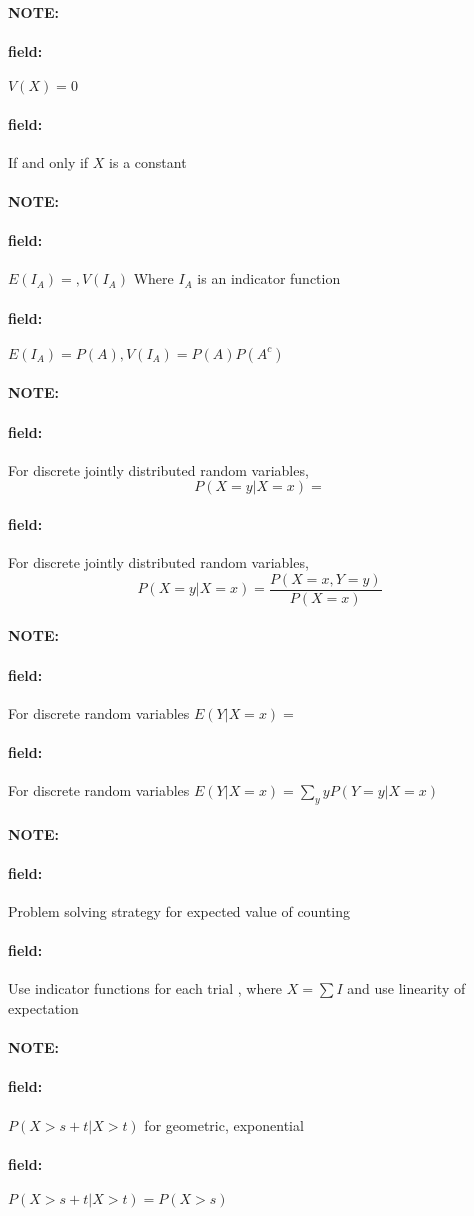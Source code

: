 \documentclass[12pt]{article}
\newenvironment{note}{\paragraph{NOTE:}}{}
\newenvironment{field}{\paragraph{field:}}{}
\begin{document}
\begin{note}
  \begin{field}
    $V(X) = 0$
  \end{field}
  \begin{field}
    If and only if $X $ is a constant
  \end{field}
\end{note}

\begin{note}
  \begin{field}
    $E(I_A) = , V(I_A)$ Where $I_A$ is an indicator function
  \end{field}
  \begin{field}
    $E(I_A) = P(A), V(I_A) = P(A)P(A^c)$
  \end{field}
\end{note}

\begin{note}
  \begin{field}
    For discrete jointly distributed random variables,
    $$ P(X = y | X = x) = $$
  \end{field}
  \begin{field}
    For discrete jointly distributed random variables,
    $$ P(X = y | X = x) = \frac{P(X=x,Y=y)}{P(X=x)}$$
  \end{field}
\end{note}

\begin{note}
  \begin{field}
    For discrete random variables
    $E(Y|X=x) = $
  \end{field}
  \begin{field}
    For discrete random variables
    $E(Y|X=x) = \sum_y y P(Y = y | X = x)$
  \end{field}
\end{note}

\begin{note}
  \begin{field}
    Problem solving strategy for expected value of counting
  \end{field}
  \begin{field}
    Use indicator functions for each trial , where $X = \sum I$ and use linearity of expectation
  \end{field}
\end{note}


\begin{note}
  \begin{field}
    $P(X > s + t|X > t)$ for geometric, exponential
  \end{field}
  \begin{field}
    $P(X > s + t|X > t) = P(X > s)$
  \end{field}
\end{note}
\end{document}
